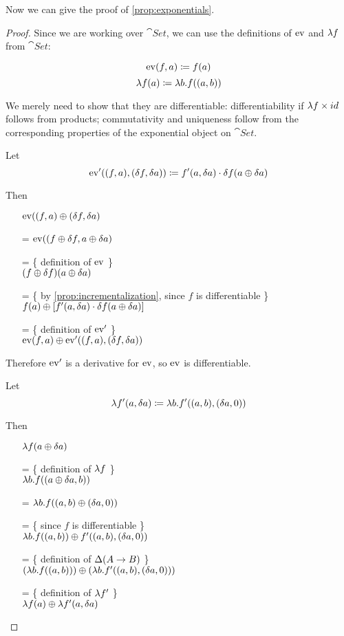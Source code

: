 Now we can give the proof of \ref{prop:exponentials}.

\begin{proof}
  Since we are working over $\cat{Set}$, we can use the definitions of $\operatorname{ev}$ and
  $\lambda f$ from $\cat{Set}$:

  $$\operatorname{ev}(f, a) \coloneqq f(a)$$
  $$\lambda f(a) \coloneqq \lambda b. f((a, b))$$
  
  We merely need to show that they are differentiable: differentiability if $\lambda f
  \times id$ follows from products; commutativity and
  uniqueness follow from the corresponding properties of the exponential object
  on $\cat{Set}$.

  Let 
  $$\operatorname{ev}'((f, a), (\delta f, \delta a)) \coloneqq f'(a, \delta a) \cdot \delta f(a \oplus \delta a)$$

  Then
  \begin{itemize}
    \item[ ]$\operatorname{ev}((f, a) \oplus (\delta f, \delta a)$
    \item[=]$\operatorname{ev}((f \oplus \delta f, a \oplus \delta a)$
    \item[=]\{ definition of $\operatorname{ev}$ \}\\
      $(f \oplus \delta f)(a \oplus \delta a)$
    \item[=]\{ by \ref{prop:incrementalization}, since $f$ is differentiable \}\\
      $f(a) \oplus \left[f'(a, \delta a) \cdot \delta f(a \oplus \delta a) \right]$
    \item[=]\{ definition of $\operatorname{ev}'$ \}\\
      $\operatorname{ev}(f, a) \oplus \operatorname{ev}'((f, a), (\delta f, \delta a))$
  \end{itemize}
  Therefore $\operatorname{ev}'$ is a derivative for $\operatorname{ev}$, so $\operatorname{ev}$ is differentiable.
  
  Let
  $$\lambda f'(a, \delta a) \coloneqq \lambda b. f'((a, b),
  (\delta a, 0))$$
  
  Then
  \begin{itemize}
    \item[ ]$\lambda f(a \oplus \delta a)$
    \item[=]\{ definition of $\lambda f$ \}\\
      $\lambda b. f((a \oplus \delta a, b))$
    \item[=] $\lambda b. f((a, b) \oplus (\delta a, 0))$
    \item[=]\{ since $f$ is differentiable \}\\
      $\lambda b. f((a, b)) \oplus f'((a, b), (\delta a, 0))$
    \item[=]\{ definition of $\Delta (A \rightarrow B)$ \}\\
      $(\lambda b. f((a, b))) \oplus (\lambda b. f'((a, b), (\delta a, 0)))$
    \item[=]\{ definition of $\lambda f'$ \}\\
      $\lambda f(a) \oplus \lambda f'(a, \delta a)$
  \end{itemize}


\end{proof}
